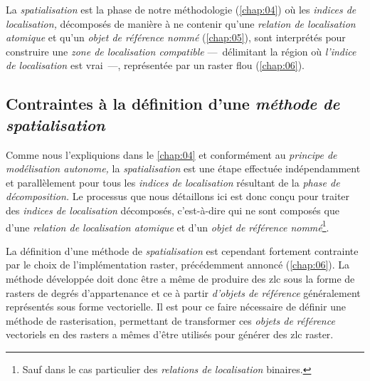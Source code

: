 La \emph{spatialisation} est la phase de notre méthodologie
(\autoref{chap:04}) où les \emph{indices de localisation,} décomposés
de manière à ne contenir qu'une \emph{relation de localisation
  atomique} et qu'un \emph{objet de référence nommé}
(\autoref{chap:05}), sont interprétés pour construire une \emph{zone
  de localisation compatible} ---~délimitant la région où
\emph{l'indice de localisation} est vrai~---, représentée par un
raster flou (\autoref{chap:06}).

\subsection{Contraintes à la définition d'une \emph{méthode de spatialisation}}

Comme nous l'expliquions dans le \autoref{chap:04} et conformément au
\emph{principe de modélisation autonome,} la \emph{spatialisation} est
une étape effectuée indépendamment et parallèlement pour tous les
\emph{indices de localisation} résultant de la \emph{phase de
  décomposition.} Le processus que nous détaillons ici est donc conçu
pour traiter des \emph{indices de localisation} décomposés,
c'est-à-dire qui ne sont composés que d'une \emph{relation de
  localisation atomique} et d'un \emph{objet de référence
  nommé}\footnote{Sauf dans le cas particulier des \emph{relations de
    localisation} binaires.}.

La définition d'une méthode de \emph{spatialisation} est cependant
fortement contrainte par le choix de l'implémentation raster,
précédemment annoncé (\autoref{chap:06}). La méthode développée doit
donc être a même de produire des \ac{zlc} sous la forme de rasters de
degrés d'appartenance et ce à partir \emph{d'objets de référence}
généralement représentés sous forme vectorielle. Il est pour ce faire
nécessaire de définir une méthode de rasterisation, permettant de
transformer ces \emph{objets de référence} vectoriels en des rasters a
mêmes d'être utilisés pour générer des \ac{zlc} raster.

